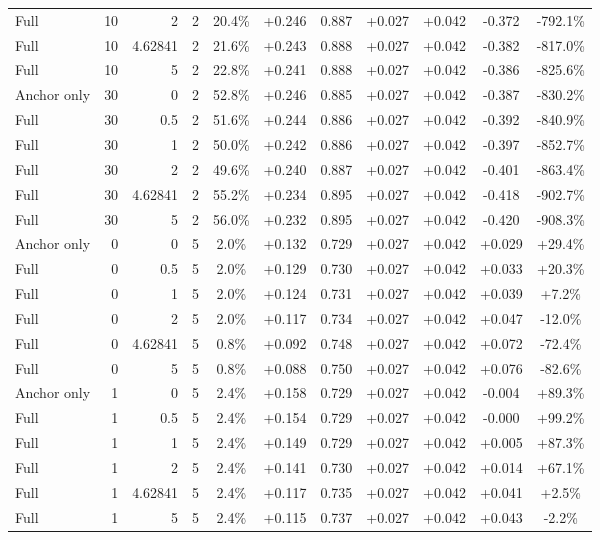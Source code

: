 \begin{table}[htbp]
\begin{tabular}{lrrrccccccc}
Full & 10 & 2 & 2 & 20.4\% & +0.246 & 0.887 & +0.027 & +0.042 & -0.372 & -792.1\% \\
Full & 10 & 4.62841 & 2 & 21.6\% & +0.243 & 0.888 & +0.027 & +0.042 & -0.382 & -817.0\% \\
Full & 10 & 5 & 2 & 22.8\% & +0.241 & 0.888 & +0.027 & +0.042 & -0.386 & -825.6\% \\
Anchor only & 30 & 0 & 2 & 52.8\% & +0.246 & 0.885 & +0.027 & +0.042 & -0.387 & -830.2\% \\
Full & 30 & 0.5 & 2 & 51.6\% & +0.244 & 0.886 & +0.027 & +0.042 & -0.392 & -840.9\% \\
Full & 30 & 1 & 2 & 50.0\% & +0.242 & 0.886 & +0.027 & +0.042 & -0.397 & -852.7\% \\
Full & 30 & 2 & 2 & 49.6\% & +0.240 & 0.887 & +0.027 & +0.042 & -0.401 & -863.4\% \\
Full & 30 & 4.62841 & 2 & 55.2\% & +0.234 & 0.895 & +0.027 & +0.042 & -0.418 & -902.7\% \\
Full & 30 & 5 & 2 & 56.0\% & +0.232 & 0.895 & +0.027 & +0.042 & -0.420 & -908.3\% \\
Anchor only & 0 & 0 & 5 & 2.0\% & +0.132 & 0.729 & +0.027 & +0.042 & +0.029 & +29.4\% \\
Full & 0 & 0.5 & 5 & 2.0\% & +0.129 & 0.730 & +0.027 & +0.042 & +0.033 & +20.3\% \\
Full & 0 & 1 & 5 & 2.0\% & +0.124 & 0.731 & +0.027 & +0.042 & +0.039 & +7.2\% \\
Full & 0 & 2 & 5 & 2.0\% & +0.117 & 0.734 & +0.027 & +0.042 & +0.047 & -12.0\% \\
Full & 0 & 4.62841 & 5 & 0.8\% & +0.092 & 0.748 & +0.027 & +0.042 & +0.072 & -72.4\% \\
Full & 0 & 5 & 5 & 0.8\% & +0.088 & 0.750 & +0.027 & +0.042 & +0.076 & -82.6\% \\
Anchor only & 1 & 0 & 5 & 2.4\% & +0.158 & 0.729 & +0.027 & +0.042 & -0.004 & +89.3\% \\
Full & 1 & 0.5 & 5 & 2.4\% & +0.154 & 0.729 & +0.027 & +0.042 & -0.000 & +99.2\% \\
Full & 1 & 1 & 5 & 2.4\% & +0.149 & 0.729 & +0.027 & +0.042 & +0.005 & +87.3\% \\
Full & 1 & 2 & 5 & 2.4\% & +0.141 & 0.730 & +0.027 & +0.042 & +0.014 & +67.1\% \\
Full & 1 & 4.62841 & 5 & 2.4\% & +0.117 & 0.735 & +0.027 & +0.042 & +0.041 & +2.5\% \\
Full & 1 & 5 & 5 & 2.4\% & +0.115 & 0.737 & +0.027 & +0.042 & +0.043 & -2.2\% \\

\end{tabular}
\end{table}
